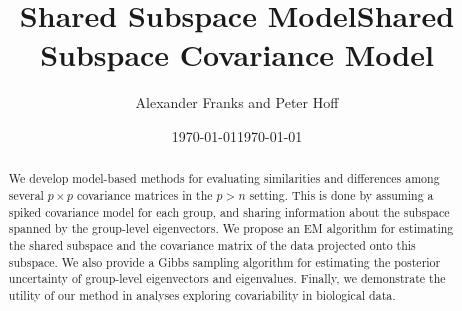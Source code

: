 \documentclass{article}
\begin{document}
\title{Shared Subspace Model}


\date{\today}


\title{Shared Subspace Covariance Model}
\author{Alexander Franks and Peter Hoff}
\date{\today}
\maketitle 



\begin{abstract}




  We develop model-based methods for evaluating similarities and
  differences among several $p\times p$ covariance matrices in the
  $p > n$ setting.  This is done by assuming a spiked covariance model
  for each group, and sharing information about the subspace spanned
  by the group-level eigenvectors.  We propose an EM algorithm for
  estimating the shared subspace and the covariance matrix of the data
  projected onto this subspace.  We also provide a Gibbs sampling
  algorithm for estimating the posterior uncertainty of group-level
  eigenvectors and eigenvalues.  Finally, we demonstrate the utility
  of our method in analyses exploring covariability in biological data.

\end{abstract}

\end{document}
